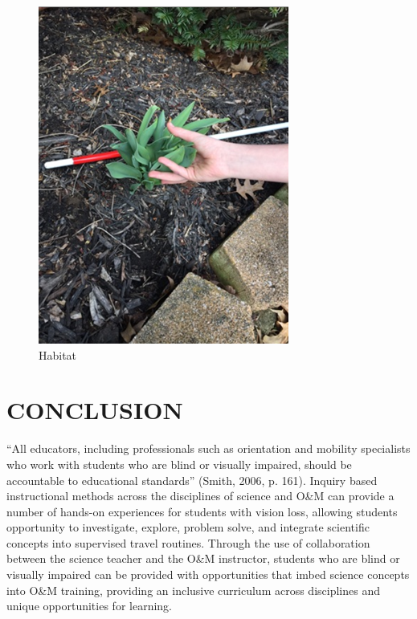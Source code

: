 \documentclass[11.5pt]{sig-alternate} %
\begin{document}
\begin{large}
\begin{figure}[h]
    \centering
    \includegraphics[width=0.8\linewidth]{fig2.png}
    \caption{Habitat}
\end{figure}

\section*{CONCLUSION}

“All educators, including professionals such as orientation and mobility specialists who work with students who are blind or visually impaired, should be accountable to educational standards” (Smith, 2006, p. 161).  Inquiry based instructional methods across the disciplines of science and O\&M can provide a number of hands-on experiences for students with vision loss, allowing students opportunity to investigate, explore, problem solve, and integrate scientific concepts into supervised travel routines. Through the use of collaboration between the science teacher and the O\&M instructor, students who are blind or visually impaired can be provided with opportunities that imbed science concepts into O\&M training, providing an inclusive curriculum across disciplines and unique opportunities for learning.

\end{large}
\clearpage
\end{document}
